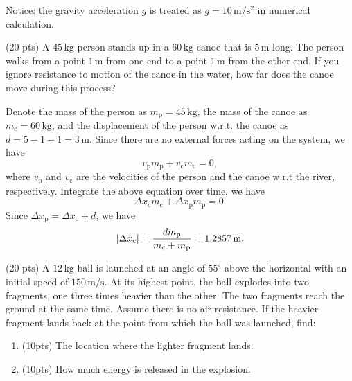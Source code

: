 \documentclass{article}
\begin{document}
Notice: the gravity acceleration \( g \) is treated as \( g=10\,\mathrm{m/s^2} \) in numerical calculation.

\begin{problem}
(20 pts) A $45\,\mathrm{kg}$ person stands up in a $60\,\mathrm{kg}$ canoe that is $5\,\mathrm{m}$ long. The person walks from a point $1\,\mathrm{m}$ from one end to a point $1\,\mathrm{m}$ from the other end. If you ignore resistance to motion of the canoe in the water, how far does the canoe move during this process?
\end{problem}

\begin{solution}
  Denote the mass of the person as $m_\mathrm{p}=45\,\mathrm{kg}$, the mass of the canoe as $m_\mathrm{c}=60\,\mathrm{kg}$, and the displacement of the person w.r.t. the canoe as $d=5-1-1=3\,\mathrm{m}$. Since there are no external forces acting on the system, we have
  \[ v_\mathrm{p}m_\mathrm{p}+v_\mathrm{c}m_\mathrm{c}=0, \]
  where $v_\mathrm{p}$ and $v_\mathrm{c}$ are the velocities of the person and the canoe w.r.t the river, respectively. Integrate the above equation over time, we have
  \[ \Delta x_\mathrm{c}m_\mathrm{c}+\Delta x_\mathrm{p}m_\mathrm{p}=0. \]
  Since $\Delta x_\mathrm{p}=\Delta x_\mathrm{c}+d$, we have
  \[ \left|\Delta x_\mathrm{c}\right|=\frac{d m_\mathrm{p}}{m_\mathrm{c}+m_\mathrm{p}}=1.2857\,\mathrm{m}. \]
\end{solution}



\begin{problem}
(20 pts) A $12\,\mathrm{kg}$ ball is launched at an angle of $55^\circ$ above the horizontal with an initial speed of $150\,\mathrm{m/s}$. At its highest point, the ball explodes into two fragments, one three times heavier than the other. The two fragments reach the ground at the same time. Assume there is no air resistance. If the heavier fragment lands back at the point from which the ball was launched, find:
\begin{enumerate}[label=(\alph*)]
	\item (10pts) The location where the lighter fragment lands.
	\item (10pts) How much energy is released in the explosion.
\end{enumerate}
\end{problem}
\end{document}
